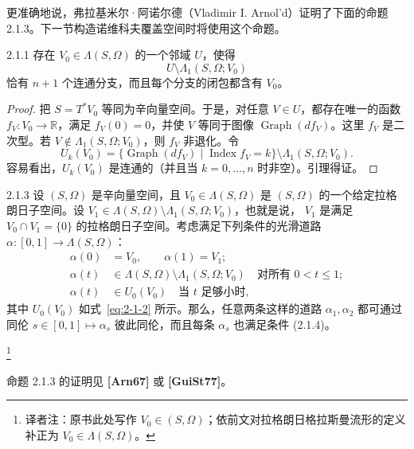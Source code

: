 更准确地说，弗拉基米尔·阿诺尔德（Vladimir I. Arnol'd）证明了下面的命题 2.1.3。下一节构造诺维科夫覆盖空间时将使用这个命题。

\begin{lemma}{2.1.1}\label{lem:2-1-1}
存在 $V_0\in\Lambda(S,\Omega)$ 的一个邻域 $U$，使得
\[
  U\setminus\Lambda_1(S,\Omega;V_0)
\]
恰有 $n+1$ 个连通分支，而且每个分支的闭包都含有 $V_0$。
\end{lemma}

\begin{proof}
把 $S=T^*V_0$ 等同为辛向量空间。于是，对任意 $V\in U$，都存在唯一的函数
$f_V:V_0\to\mathbb R$，满足 $f_V(0)=0$，并使 $V$ 等同于图像
$\operatorname{Graph}(df_V)$。这里 $f_V$ 是二次型。若
$V\notin\Lambda_1(S,\Omega;V_0)$，则 $f_V$ 非退化。令
\begin{equation}
  U_k(V_0)
  =\{\operatorname{Graph}(df_V)\mid
      \operatorname{Index}f_V=k\}
    \setminus\Lambda_1(S,\Omega;V_0).
  \tag{2.1.2}\label{eq:2-1-2}
\end{equation}
容易看出，$U_k(V_0)$ 是连通的（并且当 $k=0,\ldots,n$ 时非空）。引理得证。
\end{proof}

\begin{proposition}{2.1.3}\label{prop:2-1-3}
设 $(S,\Omega)$ 是辛向量空间，且 $V_0\in\Lambda(S,\Omega)$ 是
$(S,\Omega)$ 的一个给定拉格朗日子空间。设
$V_1\in\Lambda(S,\Omega)\setminus\Lambda_1(S,\Omega;V_0)$，也就是说，
$V_1$ 是满足 $V_0\cap V_1=\{0\}$ 的拉格朗日子空间。考虑满足下列条件的光滑道路
$\alpha:[0,1]\to\Lambda(S,\Omega)$：
\begin{align}
  \alpha(0)&=V_0,\qquad \alpha(1)=V_1;
    \tag{2.1.4.1}\label{eq:2-1-4-1}\\
  \alpha(t)&\in\Lambda(S,\Omega)\setminus
    \Lambda_1(S,\Omega;V_0)
    \quad\text{对所有 }0<t\leq1;
    \tag{2.1.4.2}\label{eq:2-1-4-2}\\
  \alpha(t)&\in U_0(V_0)\quad\text{当 }t\text{ 足够小时},
    \tag{2.1.4.3}\label{eq:2-1-4-3}
\end{align}
其中 $U_0(V_0)$ 如式~\eqref{eq:2-1-2} 所示。那么，任意两条这样的道路
$\alpha_1,\alpha_2$ 都可通过同伦 $s\in[0,1]\mapsto\alpha_s$ 彼此同伦，而且每条
$\alpha_s$ 也满足条件 (2.1.4)。
\end{proposition}

\footnote{译者注：原书此处写作 $V_0\in(S,\Omega)$；依前文对拉格朗日格拉斯曼流形的定义补正为 $V_0\in\Lambda(S,\Omega)$。}

命题 2.1.3 的证明见 \textbf{[Arn67]} 或 \textbf{[GuiSt77]}。

